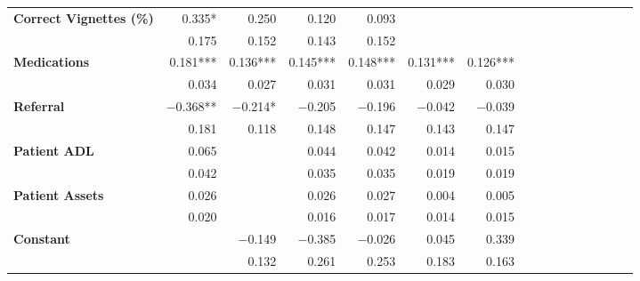 \begin{tabular}{@{\extracolsep{5pt}}lrrrrrrrrrrrrrrr}
{\bf Correct Vignettes (\%)} & 0.335\phantom{)}*\phantom{**} & 0.250\phantom{\phantom{)}***} & 0.120\phantom{\phantom{)}***} & 0.093\phantom{\phantom{)}***} & \phantom{***} & \phantom{***} \\
{\bf } & 0.175\phantom{\phantom{)}***} & 0.152\phantom{\phantom{)}***} & 0.143\phantom{\phantom{)}***} & 0.152\phantom{\phantom{)}***} & \phantom{***} & \phantom{***} \\
{\bf Medications} & 0.181\phantom{)}*** & 0.136\phantom{)}*** & 0.145\phantom{)}*** & 0.148\phantom{)}*** & 0.131\phantom{)}*** & 0.126\phantom{)}*** \\
{\bf } & 0.034\phantom{\phantom{)}***} & 0.027\phantom{\phantom{)}***} & 0.031\phantom{\phantom{)}***} & 0.031\phantom{\phantom{)}***} & 0.029\phantom{\phantom{)}***} & 0.030\phantom{\phantom{)}***} \\
{\bf Referral} & $-$0.368\phantom{)}**\phantom{*} & $-$0.214\phantom{)}*\phantom{**} & $-$0.205\phantom{\phantom{)}***} & $-$0.196\phantom{\phantom{)}***} & $-$0.042\phantom{\phantom{)}***} & $-$0.039\phantom{\phantom{)}***} \\
{\bf } & 0.181\phantom{\phantom{)}***} & 0.118\phantom{\phantom{)}***} & 0.148\phantom{\phantom{)}***} & 0.147\phantom{\phantom{)}***} & 0.143\phantom{\phantom{)}***} & 0.147\phantom{\phantom{)}***} \\
{\bf Patient ADL} & 0.065\phantom{\phantom{)}***} & \phantom{***} & 0.044\phantom{\phantom{)}***} & 0.042\phantom{\phantom{)}***} & 0.014\phantom{\phantom{)}***} & 0.015\phantom{\phantom{)}***} \\
{\bf } & 0.042\phantom{\phantom{)}***} & \phantom{***} & 0.035\phantom{\phantom{)}***} & 0.035\phantom{\phantom{)}***} & 0.019\phantom{\phantom{)}***} & 0.019\phantom{\phantom{)}***} \\
{\bf Patient Assets} & 0.026\phantom{\phantom{)}***} & \phantom{***} & 0.026\phantom{\phantom{)}***} & 0.027\phantom{\phantom{)}***} & 0.004\phantom{\phantom{)}***} & 0.005\phantom{\phantom{)}***} \\
{\bf } & 0.020\phantom{\phantom{)}***} & \phantom{***} & 0.016\phantom{\phantom{)}***} & 0.017\phantom{\phantom{)}***} & 0.014\phantom{\phantom{)}***} & 0.015\phantom{\phantom{)}***} \\
{\bf Constant} & \phantom{***} & $-$0.149\phantom{\phantom{)}***} & $-$0.385\phantom{\phantom{)}***} & $-$0.026\phantom{\phantom{)}***} & 0.045\phantom{\phantom{)}***} & 0.339\phantom{\phantom{)}***} \\
{\bf } & \phantom{***} & 0.132\phantom{\phantom{)}***} & 0.261\phantom{\phantom{)}***} & 0.253\phantom{\phantom{)}***} & 0.183\phantom{\phantom{)}***} & 0.163\phantom{\phantom{)}***} \\

\end{tabular}
